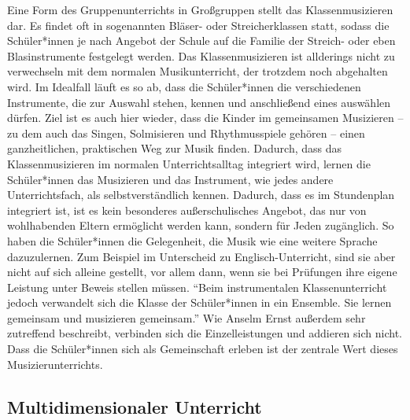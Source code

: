 Eine Form des Gruppenunterrichts in Großgruppen stellt das Klassenmusizieren
dar. Es findet oft in sogenannten Bläser- oder Streicherklassen statt, sodass
die Schüler*innen je nach Angebot der Schule auf die Familie der Streich- oder
eben Blasinstrumente festgelegt werden. Das Klassenmusizieren ist allderings
nicht zu verwechseln mit dem normalen Musikunterricht, der trotzdem noch
abgehalten wird. Im Idealfall läuft es so ab, dass die Schüler*innen die
verschiedenen Instrumente, die zur Auswahl stehen, kennen und anschließend eines
auswählen dürfen. Ziel ist es auch hier wieder, dass die Kinder im gemeinsamen
Musizieren – zu dem auch das Singen, Solmisieren und Rhythmusspiele gehören –
einen ganzheitlichen, praktischen Weg zur Musik finden.
\autocite[91]{ernst:die_zukunftsfaehige_musikschule} Dadurch, dass das
Klassenmusizieren im normalen Unterrichtsalltag integriert wird, lernen die
Schüler*innen das Musizieren und das Instrument, wie jedes andere
Unterrichtsfach, als selbstverständlich kennen. Dadurch, dass es im Stundenplan
integriert ist, ist es kein besonderes außerschulisches Angebot, das nur von
wohlhabenden Eltern ermöglicht werden kann, sondern für Jeden zugänglich. So
haben die Schüler*innen die Gelegenheit, die Musik wie eine weitere Sprache
dazuzulernen. Zum Beispiel im Unterscheid zu Englisch-Unterricht, sind sie
aber nicht auf sich alleine gestellt, vor allem dann, wenn sie bei Prüfungen
ihre eigene Leistung unter Beweis stellen müssen. \enquote{Beim instrumentalen
Klassenunterricht jedoch verwandelt sich die Klasse der Schüler*innen in ein
Ensemble. Sie lernen gemeinsam und musizieren gemeinsam.}
\autocite[92]{ernst:die_zukunftsfaehige_musikschule} Wie Anselm Ernst außerdem
sehr zutreffend beschreibt, verbinden sich die Einzelleistungen und addieren
sich nicht. Dass die Schüler*innen sich als Gemeinschaft erleben ist der
zentrale Wert dieses Musizierunterrichts.








\subsection{Multidimensionaler Unterricht} 

